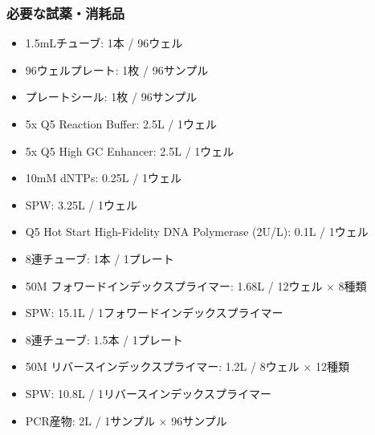 \documentclass[titlepage,10pt,a4paper]{jsbook}
\begin{document}
\subsubsection{必要な試薬・消耗品}
\begin{itemize}
\item 1.5mLチューブ: 1本 / 96ウェル
\item 96ウェルプレート: 1枚 / 96サンプル
\item プレートシール: 1枚 / 96サンプル
\item 5x Q5 Reaction Buffer: 2.5{\textmu}L / 1ウェル
\item 5x Q5 High GC Enhancer: 2.5{\textmu}L / 1ウェル
\item 10mM dNTPs: 0.25{\textmu}L / 1ウェル
\item SPW: 3.25{\textmu}L / 1ウェル
\item Q5 Hot Start High-Fidelity DNA Polymerase (2U/{\textmu}L): 0.1{\textmu}L / 1ウェル
\item 8連チューブ: 1本 / 1プレート
\item 50{\textmu}M フォワードインデックスプライマー: 1.68{\textmu}L / 12ウェル × 8種類
\item SPW: 15.1{\textmu}L / 1フォワードインデックスプライマー
\item 8連チューブ: 1.5本 / 1プレート
\item 50{\textmu}M リバースインデックスプライマー: 1.2{\textmu}L / 8ウェル × 12種類
\item SPW: 10.8{\textmu}L / 1リバースインデックスプライマー
\item PCR産物: 2{\textmu}L / 1サンプル × 96サンプル
\end{itemize}
\end{document}
